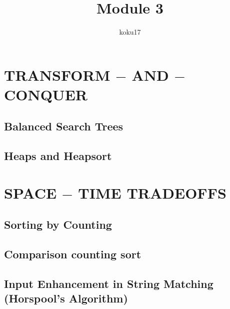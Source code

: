 \documentclass{article}
\author{koku17}
\title{Module 3}
\begin{document}
	\maketitle \thispagestyle{empty} \newpage
	\tableofcontents \thispagestyle{empty} \newpage \setcounter{page}{1}
	\section{TRANSFORM $-$ AND $-$ CONQUER}
	\subsection{Balanced Search Trees}
	\subsection{Heaps and Heapsort}

	\section{SPACE $-$ TIME TRADEOFFS}
	\subsection{Sorting by Counting}
	\subsection{Comparison counting sort}
	\subsection{Input Enhancement in String Matching (Horspool's Algorithm)}
\end{document}
